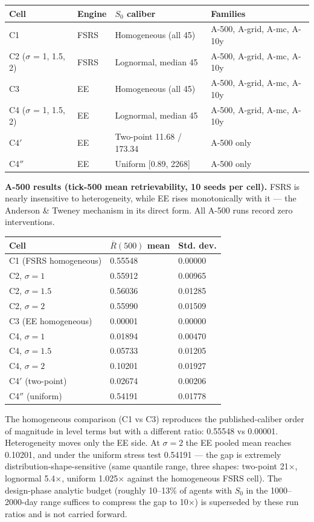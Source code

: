 \documentclass[11pt]{article}
\begin{document}
\begin{table}[htbp]
\centering
\begin{tabular}{llll}
\toprule
\textbf{Cell} & \textbf{Engine} & \textbf{$S_0$ caliber} & \textbf{Families} \\
\midrule
C1 & FSRS & Homogeneous (all 45) & A-500, A-grid, A-mc, A-10y \\
C2 ($\sigma$ = 1, 1.5, 2) & FSRS & Lognormal, median 45 & A-500, A-grid, A-mc, A-10y \\
C3 & EE & Homogeneous (all 45) & A-500, A-grid, A-mc, A-10y \\
C4 ($\sigma$ = 1, 1.5, 2) & EE & Lognormal, median 45 & A-500, A-grid, A-mc, A-10y \\
C4$'$ & EE & Two-point 11.68 / 173.34 & A-500 only \\
C4$''$ & EE & Uniform [0.89, 2268] & A-500 only \\
\bottomrule
\end{tabular}
\end{table}

\textbf{A-500 results (tick-500 mean retrievability, 10 seeds per cell).} FSRS is nearly insensitive to heterogeneity, while EE rises monotonically with it --- the Anderson \& Tweney mechanism in its direct form. All A-500 runs record zero interventions.

\begin{table}[htbp]
\centering
\begin{tabular}{lll}
\toprule
\textbf{Cell} & \textbf{$\overline{R}(500)$ mean} & \textbf{Std. dev.} \\
\midrule
C1 (FSRS homogeneous) & 0.55548 & 0.00000 \\
C2, $\sigma=1$ & 0.55912 & 0.00965 \\
C2, $\sigma=1.5$ & 0.56036 & 0.01285 \\
C2, $\sigma=2$ & 0.55990 & 0.01509 \\
C3 (EE homogeneous) & 0.00001 & 0.00000 \\
C4, $\sigma=1$ & 0.01894 & 0.00470 \\
C4, $\sigma=1.5$ & 0.05733 & 0.01205 \\
C4, $\sigma=2$ & 0.10201 & 0.01927 \\
C4$'$ (two-point) & 0.02674 & 0.00206 \\
C4$''$ (uniform) & 0.54191 & 0.01778 \\
\bottomrule
\end{tabular}
\end{table}

The homogeneous comparison (C1 vs C3) reproduces the published-caliber order of magnitude in level terms but with a different ratio: 0.55548 vs 0.00001. Heterogeneity moves only the EE side. At $\sigma=2$ the EE pooled mean reaches 0.10201, and under the uniform stress test 0.54191 --- the gap is extremely distribution-shape-sensitive (same quantile range, three shapes: two-point 21$\times$, lognormal 5.4$\times$, uniform 1.025$\times$ against the homogeneous FSRS cell). The design-phase analytic budget (roughly 10--13\% of agents with $S_0$ in the 1000--2000-day range suffices to compress the gap to 10$\times$) is superseded by these run ratios and is not carried forward.
\end{document}
